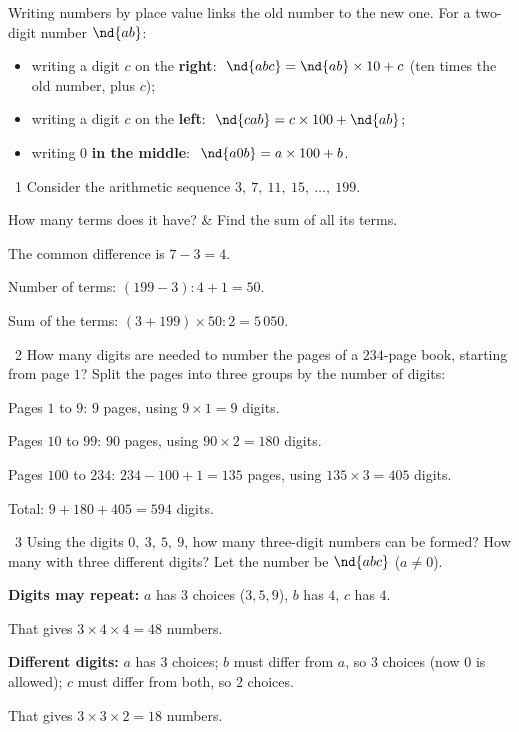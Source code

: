 \begin{knowbox}
Writing numbers by place value links the old number to the new one. For a two-digit number $\nd{ab}$:\par\smallskip
\begin{itemize}[leftmargin=1.4em,itemsep=3pt]
\item writing a digit $c$ on the \textbf{right}: $\ \nd{abc}=\nd{ab}\times10+c$ (ten times the old number, plus $c$);
\item writing a digit $c$ on the \textbf{left}: $\ \nd{cab}=c\times100+\nd{ab}$;
\item writing $0$ \textbf{in the middle}: $\ \nd{a0b}=a\times100+b$.
\end{itemize}
\end{knowbox}
\gap
\begin{exbox}{\ExWord\ 1}
Consider the arithmetic sequence $3,\ 7,\ 11,\ 15,\ \dots,\ 199$.
\begin{cols2}
 How many terms does it have? &  Find the sum of all its terms.
\end{cols2}
\guide
The common difference is $7-3=4$.\par
{} Number of terms: $(199-3):4+1=50$.\par
{} Sum of the terms: $(3+199)\times50:2=5\,050$.
\end{exbox}
\gap
\begin{exbox}{\ExWord\ 2}
How many digits are needed to number the pages of a $234$-page book, starting from page $1$?
\guide
Split the pages into three groups by the number of digits:\par
Pages $1$ to $9$: $9$ pages, using $9\times1=9$ digits.\par
Pages $10$ to $99$: $90$ pages, using $90\times2=180$ digits.\par
Pages $100$ to $234$: $234-100+1=135$ pages, using $135\times3=405$ digits.\par
Total: $9+180+405=594$ digits.
\end{exbox}
\gap
\begin{exbox}{\ExWord\ 3}
Using the digits $0,\ 3,\ 5,\ 9$, how many three-digit numbers can be formed? How many with three different digits?
\guide
Let the number be $\nd{abc}$ ($a\ne0$).\par
\textbf{Digits may repeat:} $a$ has $3$ choices ($3,5,9$), $b$ has $4$, $c$ has $4$.\par That gives $3\times4\times4=48$ numbers.\par
\textbf{Different digits:} $a$ has $3$ choices; $b$ must differ from $a$, so $3$ choices (now $0$ is allowed); $c$ must differ from both, so $2$ choices.\par That gives $3\times3\times2=18$ numbers.
\end{exbox}
